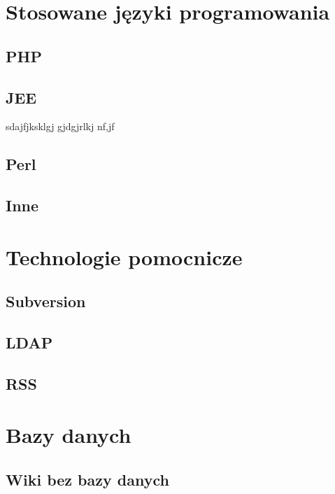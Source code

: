 \documentclass{article}
\begin{document}
			
	

\section{Stosowane języki programowania}
	
	\subsection{PHP} %
	\subsection{JEE}
		sdajfjksklgj gjdgjrlkj nf,jf
	\subsection{Perl}
	\subsection{Inne}

\section{Technologie pomocnicze}
	\subsection{Subversion}  
	\subsection{LDAP}
	\subsection{RSS}
\section{Bazy danych}
	\subsection{Wiki bez bazy danych}
\end{document}
